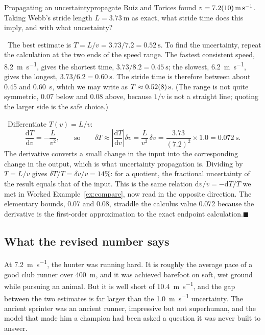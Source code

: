 \documentclass[11pt,twoside,openany]{book}
\newcommand{\dd}{\mathrm{d}}
\newcommand{\deriv}[2]{\frac{\dd #1}{\dd #2}}
\newcommand{\viewtag}[3]{\fcolorbox{#2}{#3}{\footnotesize\textbf{\textcolor{#2}{#1}}}}
\newcommand{\elemtag}{\viewtag{Elementary}{elemcol}{elempale}}
\newcommand{\calctag}{\viewtag{Calculus}{calccol}{calcpale}}
\newcommand{\elem}{\par\medskip\noindent\elemtag\ }
\newcommand{\calc}{\par\medskip\noindent\calctag\ }
\newcommand{\qed}{\hfill$\blacksquare$}
\begin{document}
\begin{example}{Propagating an uncertainty}{propagate}
Ruiz and Torices found $v = \SI{7.2 \pm 1.0}{\metre\per\second}$. Taking Webb's stride length $L = \SI{3.73}{\metre}$ as exact, what stride time does this imply, and with what uncertainty?

\elem The best estimate is $T = L/v = 3.73/7.2 = \SI{0.52}{\second}$. To find the uncertainty, repeat the calculation at the two ends of the speed range. The fastest consistent speed, \SI{8.2}{\metre\per\second}, gives the shortest time, $3.73/8.2 = \SI{0.45}{\second}$; the slowest, \SI{6.2}{\metre\per\second}, gives the longest, $3.73/6.2 = \SI{0.60}{\second}$. The stride time is therefore between about \num{0.45} and \SI{0.60}{\second}, which we may write as $T \approx \SI{0.52 \pm 0.08}{\second}$. (The range is not quite symmetric, \num{0.07} below and \num{0.08} above, because $1/v$ is not a straight line; quoting the larger side is the safe choice.)

\calc Differentiate $T(v) = L/v$:
\[
\deriv{T}{v} = -\frac{L}{v^2}, \qquad\text{so}\qquad \delta T \approx \left|\deriv{T}{v}\right|\delta v = \frac{L}{v^2}\,\delta v = \frac{3.73}{(7.2)^2}\times 1.0 = \SI{0.072}{\second}.
\]
The derivative converts a small change in the input into the corresponding change in the output, which is what uncertainty propagation is. Dividing by $T = L/v$ gives $\delta T/T = \delta v/v = 14\%$: for a quotient, the fractional uncertainty of the result equals that of the input. This is the same relation $\dd v/v = -\dd T/T$ we met in Worked Example~\ref{ex:compare}, now read in the opposite direction. The elementary bounds, \num{0.07} and \num{0.08}, straddle the calculus value \num{0.072} because the derivative is the first-order approximation to the exact endpoint calculation.\qed
\end{example}

\subsection{What the revised number says}

At \SI{7.2}{\metre\per\second}, the hunter was running hard. It is roughly the average pace of a good club runner over \SI{400}{\metre}, and it was achieved barefoot on soft, wet ground while pursuing an animal. But it is well short of \SI{10.4}{\metre\per\second}, and the gap between the two estimates is far larger than the \SI{1.0}{\metre\per\second} uncertainty. The ancient sprinter was an ancient runner, impressive but not superhuman, and the model that made him a champion had been asked a question it was never built to answer.
\end{document}
